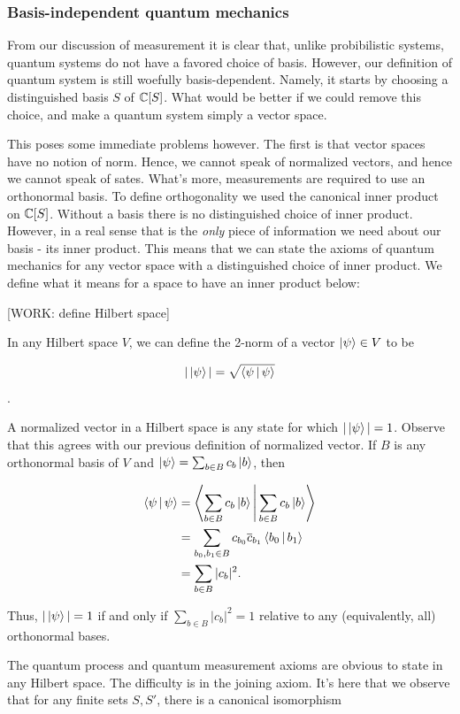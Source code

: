 \documentclass{article}
\theoremstyle{definition}
\numberwithin{figure}{section}
\begin{document}
\subsubsection{Basis-independent quantum mechanics}

From our discussion of measurement it is clear that, unlike probibilistic systems, quantum systems do not have a favored choice of basis. However, our definition of quantum system is still woefully basis-dependent. Namely, it starts by choosing a distinguished basis $S$ of $\mathbb{C}[S]$. What would be better if we could remove this choice, and make a quantum system simply a vector space.

This poses some immediate problems however. The first is that vector spaces have no notion of norm. Hence, we cannot speak of normalized vectors, and hence we cannot speak of sates. What's more, measurements are required to use an orthonormal basis. To define orthogonality we used the canonical inner product on $\mathbb{C}[S]$. Without a basis there is no distinguished choice of inner product. However, in a real sense that is the \textit{only} piece of information we need about our basis - its inner product. This means that we can state the axioms of quantum mechanics for any vector space with a distinguished choice of inner product. We define what it means for a space to have an inner product below:

[WORK: define Hilbert space]

In any Hilbert space $V$, we can define the 2-norm of a vector $\ket{\psi}\in V$ to be

$$|\ket{\psi}|=\sqrt{\Braket{\psi | \psi}}$$.

A normalized vector in a Hilbert space is any state for which $|\ket{\psi}|=1$. Observe that this agrees with our previous definition of normalized vector. If $B$ is any orthonormal basis of $V$ and $\ket{\psi}=\sum_{b\in B}c_b \ket{b}$, then

\begin{align*}
\Braket{\psi|\psi}&=\Braket{\sum_{b\in B}c_b\left|b\right>|\sum_{b\in B}c_b \left|b\right>}\\
&=\sum_{b_0,b_1\in B}c_{b_0}\overline{c}_{b_1}\Braket{b_0 | b_1}\\
&=\sum_{b\in B} |c_b|^2.
\end{align*}

Thus, $|\ket{\psi}|=1$ if and only if $\sum_{b\in B} |c_b|^2=1$ relative to any (equivalently, all) orthonormal bases.

The quantum process and quantum measurement axioms are obvious to state in any Hilbert space. The difficulty is in the joining axiom. It's here that we observe that for any finite sets $S,S'$, there is a canonical isomorphism
\end{document}
